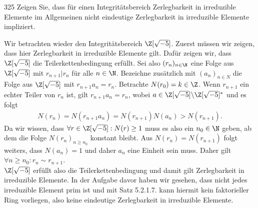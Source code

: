 \begin{algebraUE}{325}
Zeigen Sie, dass für einen Integritätsbereich Zerlegbarkeit in
irreduzible Elemente im Allgemeinen nicht eindeutige Zerlegbarkeit in
irreduzible Elemente impliziert.
\end{algebraUE}
\begin{solution}
Wir betrachten wieder den Integritätsbereich $\Z[\sqrt{-5}]$.
Zuerst müssen wir zeigen, dass hier Zerlegbarkeit in irreduzible Elemente gilt.
Dafür zeigen wir, dass $\Z[\sqrt{-5}]$ die Teilerkettenbedingung erfüllt.
Sei also $(r_n)_{n \in \N}$ eine Folge aus $\Z[\sqrt{-5}]$ mit $r_{n+1} | r_n$
für alle $n \in \N$. Bezeichne zusätzlich mit $(a_n)_{n \in N}$ die Folge aus $\Z[\sqrt{-5}]$
mit $r_{n+1}a_n = r_n$.
Betrachte $N(r_0) = k \in \Z$. Wenn $r_{n+1}$ ein echter Teiler
von $r_n$ ist, gilt $r_{n+1}a_n = r_n$, wobei $a \in \Z[\sqrt{-5}]\backslash \Z[\sqrt{-5}]^*$ und es folgt
\begin{align*}
  N(r_n) = N(r_{n+1}a_n) = N(r_{n+1})N(a_n) > N(r_{n+1}).
\end{align*}
Da wir wissen, dass $\forall r \in \Z[\sqrt{-5}]: N(r) \geq 1$ muss es also ein $n_0 \in \N$
geben, ab dem die Folge $N(r_n)_{n \geq n_0}$ konstant bleibt.
Aus $N(r_n) = N(r_{n+1})$ folgt weiters, dass $N(a_n) = 1$ und daher $a_n$
eine Einheit sein muss. Daher gilt $\forall n \geq n_0: r_n \sim r_{n+1}$. \\
$\Z[\sqrt{-5}]$ erfüllt also die Teilerkettenbedingung und damit gilt Zerlegbarkeit
in irreduzible Elemente. In der Aufgabe davor haben wir gesehen, dass nicht jedes
irreduzible Element prim ist und mit Satz 5.2.1.7. kann hiermit kein faktorieller
Ring vorliegen, also keine eindeutige Zerlegbarkeit in irreduzible Elemente.
\end{solution}
